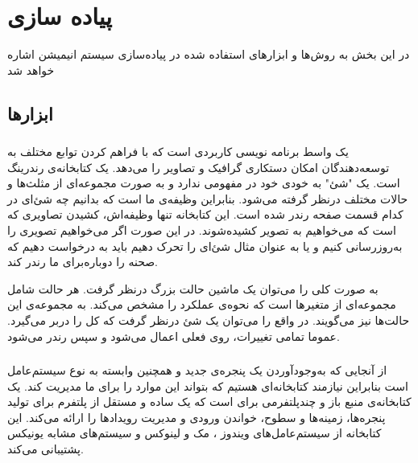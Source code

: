 \chapter { پیاده سازی }

در این بخش به روش‌ها و ابزارهای استفاده شده در پیاده‌سازی سیستم انیمیشن اشاره خواهد شد

\section {ابزارها}

\subsection {
    }

یک واسط برنامه نویسی کاربردی  
است که با فراهم کردن توابع مختلف به توسعه‌دهندگان امکان دستکاری گرافیک و تصاویر را می‌دهد.
یک کتابخانه‌ی رندرینگ است.
یک "شئ" به خودی خود در
مفهومی ندارد
و به صورت مجموعه‌ای از مثلث‌ها و حالات مختلف درنظر گرفته می‌شود. بنابراین  
وظیفه‌ی ما است که بدانیم چه شئ‌ای در کدام قسمت صفحه رندر شده است. این کتابخانه تنها وظیفه‌اش، کشیدن تصاویری که است که می‌خواهیم به تصویر کشیده‌شوند.
در این صورت اگر می‌خواهیم تصویری را به‌روزرسانی کنیم و یا به عنوان مثال شئ‌ای را تحرک دهیم باید به 
درخواست دهیم که صحنه را دوباره‌برای ما رندر کند.
\cite{KhronosUsingOpenGL}

به صورت کلی 
را می‌توان یک ماشین حالت بزرگ درنظر گرفت. هر حالت شامل مجموعه‌ای از متغیر‌ها است که نحوه‌ی عملکرد
را مشخص می‌کند. 
به مجموعه‌ی این حالت‌ها 
نیز می‌گویند. 
در واقع  
را می‌توان یک شئ درنظر گرفت که کل
را دربر می‌گیرد. عموما تمامی تغییرات، روی 
فعلی اعمال می‌شود و سپس رندر می‌شود.
\cite{KhronosUsingOpenGL} \cite{LearnOpenGL_GettingStarted}


\subsection{}

از آنجایی که به‌وجود‌آوردن یک پنجره‌ی جدید و همچنین 
وابسته به نوع سیستم‌عامل است بنابراین نیازمند کتابخانه‌ای هستیم که بتواند این موارد را برای ما مدیریت کند.
یک کتابخانه‌ی منبع باز و چندپلتفرمی برای 
است که یک
ساده و مستقل از پلتفرم برای تولید پنجره‌ها، زمینه‌‌ها
و سطوح، خواندن ورودی و مدیریت رویداد‌ها
را ارائه می‌کند. 
این کتابخانه از سیستم‌عامل‌های 
ویندوز
، 
مک
و 
لینوکس
و سیستم‌های مشابه یونیکس پشتیبانی ‌می‌کند.
\cite{GLFW}


